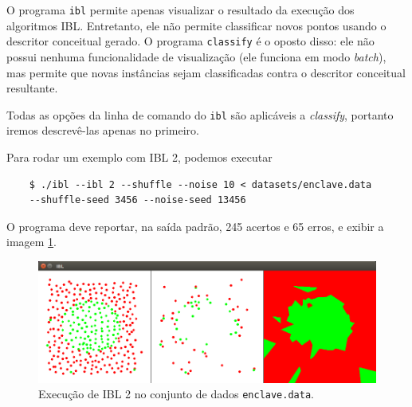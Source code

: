 \documentclass{article}
\begin{document}
O programa \texttt{ibl} permite apenas visualizar
o resultado da execução dos algoritmos IBL.
Entretanto, ele não permite classificar novos pontos
usando o descritor conceitual gerado.
O programa \texttt{classify} é o oposto disso:
ele não possui nenhuma funcionalidade de visualização
(ele funciona em modo \emph{batch}),
mas permite que novas instâncias sejam classificadas
contra o descritor conceitual resultante.

Todas as opções da linha de comando do \texttt{ibl}
são aplicáveis a \emph{classify}, portanto iremos descrevê-las apenas no primeiro.

Para rodar um exemplo com IBL 2, podemos executar
\begin{verbatim}
    $ ./ibl --ibl 2 --shuffle --noise 10 < datasets/enclave.data
    --shuffle-seed 3456 --noise-seed 13456
\end{verbatim}
O programa deve reportar, na saída padrão, 245 acertos e 65 erros,
e exibir a imagem \ref{iblimg}.

\begin{figure}[h]
    \centering
    \includegraphics[scale=0.3]{ibl.png}
    \caption{Execução de IBL 2 no conjunto de dados \texttt{enclave.data}.}
    \label{iblimg}
\end{figure}
\end{document}
